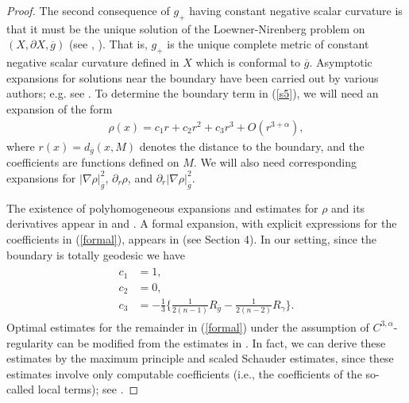 \documentclass{amsart}
\theoremstyle{definition}
\theoremstyle{remark}
\numberwithin{equation}{section}
\begin{document}
\begin{proof}
The second consequence of $g_{+}$ having constant negative scalar curvature is that it must be the unique solution of the Loewner-Nirenberg problem on $(X,\partial X, \overline{g})$ (see \cite{LN}, \cite{AM}).  That is, $g_{+}$ is the unique complete metric of constant negative scalar curvature defined in $X$ which is conformal to $\overline{g}$.
 Asymptotic expansions for solutions near the boundary have been carried out by various authors; e.g. see \cite{ACF1982CMP}.  To determine the boundary term in (\ref{s5}), we will need an expansion of the form
\begin{align} \label{formal}
\rho(x) = c_1 r + c_2 r^2 + c_3 r^3 + O(r^{3 + \alpha}),
\end{align}
where $r(x) = d_{\overline{g}}(x,M)$ denotes the distance to the boundary, and the coefficients are functions defined on $M$.  We will also need corresponding expansions for $|\nabla \rho|^2_{\overline{g}}$, $\partial_r\rho$, and $\partial_r|\nabla \rho|^2_{\overline{g}}$.

The existence of polyhomogeneous expansions and estimates for $\rho$ and its derivatives appear in \cite{ACF1982CMP} and \cite{Mazzeo1991}.  A formal expansion, with explicit expressions for the coefficients in (\ref{formal}), appears in \cite{GrahamSY} (see Section 4).  In our setting, since the boundary is totally geodesic we have
\begin{align} \label{cs} \begin{split}
c_1 &= 1, \\
c_2 &= 0, \\
c_3 &= - \frac{1}{3} \Big\{ \frac{1}{2(n-1)} R_{\overline{g}} - \frac{1}{2(n-2)} R_{\gamma} \Big\}.
\end{split}
\end{align}
Optimal estimates for the remainder in (\ref{formal}) under the assumption of $C^{3,\alpha}$-regularity can be modified from the estimates in \cite{HanJiang2014}.   In fact, we can derive these estimates by the maximum principle and scaled Schauder estimates, since these estimates involve only computable coefficients (i.e., the coefficients of the so-called local terms); see \cite{HanJiang2014}.


\end{proof}
\end{document}
